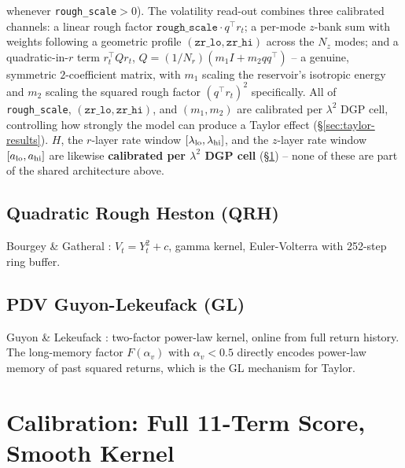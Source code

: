 \documentclass[11pt,a4paper]{article}
\begin{document}
whenever \texttt{rough\_scale}$>0$). The volatility read-out combines
three calibrated channels: a linear rough factor
$\texttt{rough\_scale}\cdot q^\top r_t$; a per-mode $z$-bank sum with
weights following a geometric profile
$(\texttt{zr\_lo},\texttt{zr\_hi})$ across the $N_z$ modes; and a
quadratic-in-$r$ term $r_t^\top Qr_t$, $Q=(1/N_r)(m_1I+m_2qq^\top)$ --
a genuine, symmetric $2$-coefficient matrix, with $m_1$ scaling the
reservoir's isotropic energy and $m_2$ scaling the squared rough
factor $(q^\top r_t)^2$ specifically. All of \texttt{rough\_scale},
$(\texttt{zr\_lo},\texttt{zr\_hi})$, and $(m_1,m_2)$ are calibrated per
$\lambda^2$ DGP cell, controlling how strongly the model can produce a
Taylor effect (\S\ref{sec:taylor-results}). $H$, the $r$-layer rate
window $[\lambda_{\rm lo},\lambda_{\rm hi}]$, and the $z$-layer rate
window $[a_{\rm lo},a_{\rm hi}]$ are likewise \textbf{calibrated per
$\lambda^2$ DGP cell} (\S\ref{sec:calib}) -- none of these are part of
the shared architecture above.

\subsection{Quadratic Rough Heston (QRH)}
Bourgey \& Gatheral \cite{bourgey2026}: $V_t=Y_t^2+c$, gamma kernel,
Euler-Volterra with 252-step ring buffer.

\subsection{PDV Guyon-Lekeufack (GL)}
Guyon \& Lekeufack \cite{guyon2023}: two-factor power-law kernel,
online from full return history. The long-memory factor $F(\alpha_v)$ with
$\alpha_v<0.5$ directly encodes power-law memory of past squared returns,
which is the GL mechanism for Taylor.

\section{Calibration: Full 11-Term Score, Smooth Kernel}
\label{sec:calib}
\end{document}

